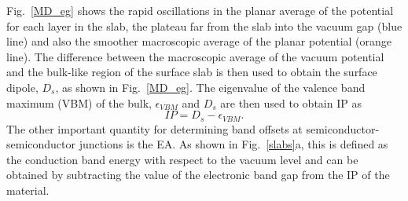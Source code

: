 \documentclass[11pt, twoside]{report}
\begin{document}
Fig.~\ref{MD_eg} shows the rapid oscillations in the planar average of the potential for each layer in the slab, the plateau far from the slab into the vacuum gap (blue line) and also the smoother macroscopic average of the planar potential (orange line).
The difference between the macroscopic average of the vacuum potential and the bulk-like region of the surface slab is then used to obtain the surface dipole, $D_s$, as shown in Fig.~\ref{MD_eg}.  The eigenvalue of the valence band maximum (VBM) of the bulk, $\epsilon_{VBM}$ and $D_s$ are then used to obtain IP as
\begin{equation}\label{IP}
IP = D_s - \epsilon_{VBM} .
\end{equation}
The other important quantity for determining band offsets at semiconductor-semiconductor junctions is the EA. As shown in Fig.~\ref{slabs}a, this is defined as the conduction band energy with respect to the vacuum level and can be obtained by subtracting the value of the electronic band gap from the IP of the material. 
\end{document}
